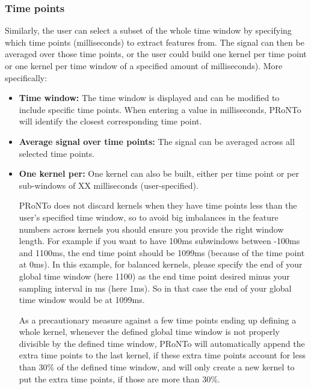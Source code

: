 \subsubsection{Time points}

Similarly, the user can select a subset of the whole time window by specifying which time points (milliseconds) to extract features from. The signal can then be averaged over those time points, or the user could build one kernel per time point or one kernel per time window of a specified amount of milliseconds). More specifically:


\begin{itemize}
\item \textbf{Time window:} The time window is displayed and can be modified to include specific time points. When entering a value in milliseconds, PRoNTo will identify the closest corresponding time point.

\item \textbf{Average signal over time points:} The signal can be averaged across all selected time points.

\item \textbf{One kernel per:} One kernel can also be built, either per time point or per sub-windows of XX milliseconds (user-specified).

PRoNTo does not discard kernels when they have time points less than the user's specified time window, so to avoid big imbalances in the feature numbers across kernels you should ensure you provide the right window length. For example if you want to have 100ms subwindows between -100ms and 1100ms, the end time point should be 1099ms (because of the time point at 0ms). In this example, for balanced kernels, please specify the end of your global time window (here 1100) as the end time point desired minus your sampling interval in ms (here 1ms). So in that case the end of your global time window would be at 1099ms.

As a precautionary measure against a few time points ending up defining a whole kernel, whenever the defined global time window is not properly divisible by the defined time window, PRoNTo will automatically append the extra time points to the last kernel, if these extra time points account for less than 30\% of the defined time window, and will only create a new kernel to put the extra time points, if those are more than 30\%.
\end{itemize}









